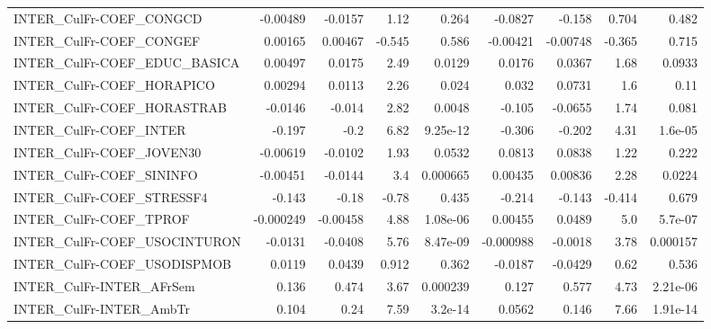 \begin{tabular}{lrrrrrrrr}
INTER\_CulFr-COEF\_CONGCD               &    -0.00489 &      -0.0157 &     1.12 &    0.264 &    -0.0827 &      -0.158 &        0.704 &         0.482 \\
INTER\_CulFr-COEF\_CONGEF               &     0.00165 &      0.00467 &   -0.545 &    0.586 &   -0.00421 &    -0.00748 &       -0.365 &         0.715 \\
INTER\_CulFr-COEF\_EDUC\_BASICA          &     0.00497 &       0.0175 &     2.49 &   0.0129 &     0.0176 &      0.0367 &         1.68 &        0.0933 \\
INTER\_CulFr-COEF\_HORAPICO             &     0.00294 &       0.0113 &     2.26 &    0.024 &      0.032 &      0.0731 &          1.6 &          0.11 \\
INTER\_CulFr-COEF\_HORASTRAB            &     -0.0146 &       -0.014 &     2.82 &   0.0048 &     -0.105 &     -0.0655 &         1.74 &         0.081 \\
INTER\_CulFr-COEF\_INTER                &      -0.197 &         -0.2 &     6.82 & 9.25e-12 &     -0.306 &      -0.202 &         4.31 &       1.6e-05 \\
INTER\_CulFr-COEF\_JOVEN30              &    -0.00619 &      -0.0102 &     1.93 &   0.0532 &     0.0813 &      0.0838 &         1.22 &         0.222 \\
INTER\_CulFr-COEF\_SININFO              &    -0.00451 &      -0.0144 &      3.4 & 0.000665 &    0.00435 &     0.00836 &         2.28 &        0.0224 \\
INTER\_CulFr-COEF\_STRESSF4             &      -0.143 &        -0.18 &    -0.78 &    0.435 &     -0.214 &      -0.143 &       -0.414 &         0.679 \\
INTER\_CulFr-COEF\_TPROF                &   -0.000249 &     -0.00458 &     4.88 & 1.08e-06 &    0.00455 &      0.0489 &          5.0 &       5.7e-07 \\
INTER\_CulFr-COEF\_USOCINTURON          &     -0.0131 &      -0.0408 &     5.76 & 8.47e-09 &  -0.000988 &     -0.0018 &         3.78 &      0.000157 \\
INTER\_CulFr-COEF\_USODISPMOB           &      0.0119 &       0.0439 &    0.912 &    0.362 &    -0.0187 &     -0.0429 &         0.62 &         0.536 \\
INTER\_CulFr-INTER\_AFrSem              &       0.136 &        0.474 &     3.67 & 0.000239 &      0.127 &       0.577 &         4.73 &      2.21e-06 \\
INTER\_CulFr-INTER\_AmbTr               &       0.104 &         0.24 &     7.59 &  3.2e-14 &     0.0562 &       0.146 &         7.66 &      1.91e-14 \\

\end{tabular}
